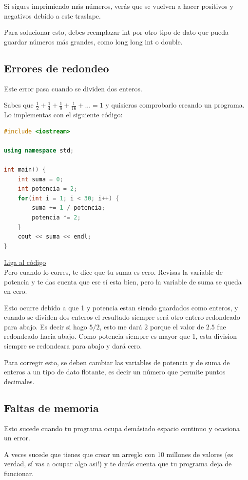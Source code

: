 \documentclass{article}
\begin{document}
Si sigues imprimiendo más números, verás que se vuelven a hacer positivos y negativos debido a este traslape.

Para solucionar esto, debes reemplazar int por otro tipo de dato que pueda guardar números más grandes, como long long int o double.

\subsection{Errores de redondeo}
Este error pasa cuando se dividen dos enteros.

Sabes que $\frac{1}{2} + \frac{1}{4} + \frac{1}{8} + \frac{1}{16} + ... = 1$ y quisieras comprobarlo creando un programa. Lo implementas con el siguiente código:

\begin{lstlisting}[language=C++, caption=Error de redondeo]
#include <iostream>

using namespace std;

int main() {
    int suma = 0;
    int potencia = 2;
    for(int i = 1; i < 30; i++) {
        suma += 1 / potencia;
        potencia *= 2;
    }
    cout << suma << endl;
}
\end{lstlisting}
\href{https://repl.it/@Jamesscn/Suma-Fraccional}{Liga al código}\\

Pero cuando lo corres, te dice que tu suma es cero. Revisas la variable de potencia y te das cuenta que ese sí esta bien, pero la variable de suma se queda en cero.

Esto ocurre debido a que 1 y potencia estan siendo guardados como enteros, y cuando se dividen dos enteros el resultado siempre será otro entero redondeado para abajo. Es decir si hago $5 / 2$, esto me dará $2$ porque el valor de $2.5$ fue redondeado hacia abajo. Como potencia siempre es mayor que 1, esta division siempre se redondeara para abajo y dará cero.

Para corregir esto, se deben cambiar las variables de potencia y de suma de enteros a un tipo de dato flotante, es decir un número que permite puntos decimales.

\subsection{Faltas de memoria}
Esto sucede cuando tu programa ocupa demásiado espacio continuo y ocasiona un error.

A veces sucede que tienes que crear un arreglo con 10 millones de valores (es verdad, sí vas a ocupar algo asi!) y te darás cuenta que tu programa deja de funcionar.
\end{document}
